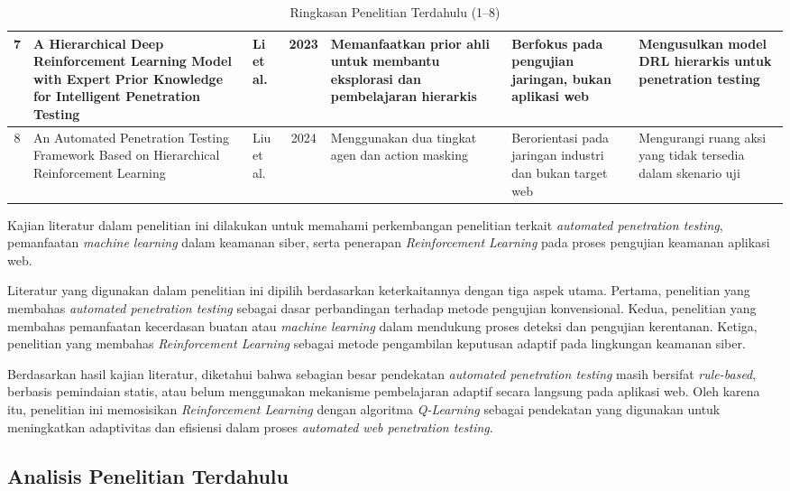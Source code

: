 \begin{table}[H]
\begin{tabularx}{\textwidth}{|c|p{3.2cm}|l|c|X|X|X|}
7 & A Hierarchical Deep Reinforcement Learning Model with Expert Prior Knowledge for Intelligent Penetration Testing & Li et al. \cite{li2023hrlpt} & 2023 & Memanfaatkan prior ahli untuk membantu eksplorasi dan pembelajaran hierarkis & Berfokus pada pengujian jaringan, bukan aplikasi web & Mengusulkan model DRL hierarkis untuk penetration testing \\ \hline

8 & An Automated Penetration Testing Framework Based on Hierarchical Reinforcement Learning & Liu et al. \cite{liu2024hrlpt} & 2024 & Menggunakan dua tingkat agen dan action masking & Berorientasi pada jaringan industri dan bukan target web & Mengurangi ruang aksi yang tidak tersedia dalam skenario uji \\ \hline

\end{tabularx}
\caption{Ringkasan Penelitian Terdahulu (1--8)}
\end{table}

Kajian literatur dalam penelitian ini dilakukan untuk memahami perkembangan penelitian terkait \textit{automated penetration testing}, pemanfaatan \textit{machine learning} dalam keamanan siber, serta penerapan \textit{Reinforcement Learning} pada proses pengujian keamanan aplikasi web.

Literatur yang digunakan dalam penelitian ini dipilih berdasarkan keterkaitannya dengan tiga aspek utama. Pertama, penelitian yang membahas \textit{automated penetration testing} sebagai dasar perbandingan terhadap metode pengujian konvensional. Kedua, penelitian yang membahas pemanfaatan kecerdasan buatan atau \textit{machine learning} dalam mendukung proses deteksi dan pengujian kerentanan. Ketiga, penelitian yang membahas \textit{Reinforcement Learning} sebagai metode pengambilan keputusan adaptif pada lingkungan keamanan siber.

Berdasarkan hasil kajian literatur, diketahui bahwa sebagian besar pendekatan \textit{automated penetration testing} masih bersifat \textit{rule-based}, berbasis pemindaian statis, atau belum menggunakan mekanisme pembelajaran adaptif secara langsung pada aplikasi web. Oleh karena itu, penelitian ini memosisikan \textit{Reinforcement Learning} dengan algoritma \textit{Q-Learning} sebagai pendekatan yang digunakan untuk meningkatkan adaptivitas dan efisiensi dalam proses \textit{automated web penetration testing}.


\subsection{Analisis Penelitian Terdahulu}

